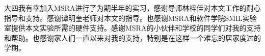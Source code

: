 \documentclass[pdfcover,bachelor]{scutthesis}
\begin{document}
\maketitle
\frontmatter

\tableofcontents{}

\mainmatter










大四我有幸加入MSRA进行了为期半年的实习，感谢导师林梓佳对本文工作的耐心指导和支持。感谢谭明奎老师对本文的指导。也感谢MSRA和软件学院SMIL实验室提供本文实验所需的硬件支持。感谢MSRA的小伙伴和学校的同学们对我的支持和帮助。也感谢家人们一直以来对我的支持，特别是在这样一个难忘的居家度过的学期。
\end{document}
